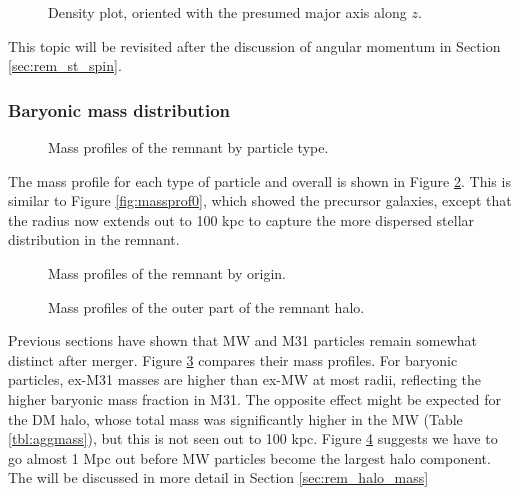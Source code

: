 \documentclass[twocolumn]{aastex63}
\begin{document}
\begin{figure}[htb!]
	\caption{Density plot, oriented with the presumed major axis along $z$.
		\label{fig:rem_tensor}}
\end{figure}

This topic will be revisited after the discussion of angular momentum in Section \ref{sec:rem_st_spin}.

\subsubsection{Baryonic mass distribution}
\label{sec:rem_baryon_mass}

\begin{figure}[htb!]
	\caption{Mass profiles of the remnant by particle type.
		\label{fig:rem_mp_type}}
\end{figure}

The mass profile for each type of particle and overall is shown in Figure \ref{fig:rem_mp_type}. This is similar to Figure \ref{fig:massprof0}, which showed the precursor galaxies, except that the radius now extends out to 100 kpc to capture the more dispersed stellar distribution in the remnant.

\begin{figure}[htb!]
	\caption{Mass profiles of the remnant by origin.
	\label{fig:rem_mp_origin}}
\end{figure}

\begin{figure}[htb!]
	\caption{Mass profiles of the outer part of the remnant halo.
		\label{fig:rem_mp_halo}}
\end{figure}

Previous sections have shown that MW and M31 particles remain somewhat distinct after merger. Figure \ref{fig:rem_mp_origin} compares their mass profiles. For baryonic particles, ex-M31 masses are higher than ex-MW at most radii, reflecting the higher baryonic mass fraction in M31. The opposite effect might be expected for the DM halo, whose total mass was significantly higher in the MW (Table \ref{tbl:aggmass}), but this is not seen out to 100 kpc. Figure \ref{fig:rem_mp_halo} suggests we have to go almost 1 Mpc out before MW particles become the largest halo component. The will be discussed in more detail in Section \ref{sec:rem_halo_mass}
\end{document}
